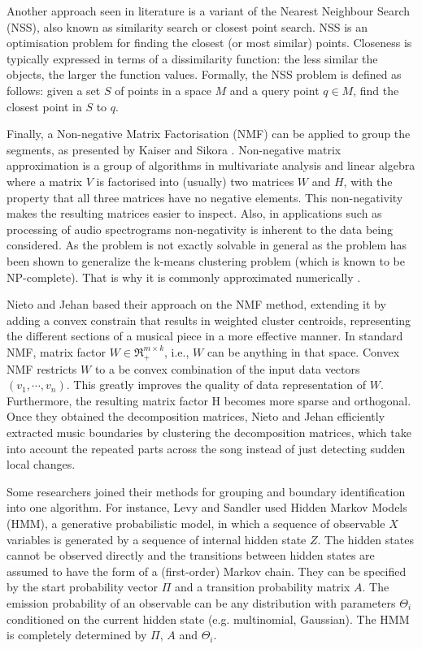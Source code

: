 Another approach seen in literature is a variant of the Nearest Neighbour Search (NSS), also known as similarity search or closest point search. NSS is an optimisation problem for finding the closest (or most similar) points. Closeness is typically expressed in terms of a dissimilarity function: the less similar the objects, the larger the function values. Formally, the NSS problem is defined as follows: given a set $S$ of points in a space $M$ and a query point $q \in M$, find the closest point in $S$ to $q$.

Finally, a Non-negative Matrix Factorisation (NMF) can be applied to group the segments, as presented by Kaiser and Sikora \cite{Sikora}. Non-negative matrix approximation is a group of algorithms in multivariate analysis and linear algebra where a matrix $V$ is factorised into (usually) two matrices $W$ and $H$, with the property that all three matrices have no negative elements. This non-negativity makes the resulting matrices easier to inspect. Also, in applications such as processing of audio spectrograms non-negativity is inherent to the data being considered. As the problem is not exactly solvable in general as the problem has been shown to generalize the k-means clustering problem (which is known to be NP-complete). That is why it is commonly approximated numerically \cite{NMFNP}.

Nieto and Jehan \cite{Nieto} based their approach on the NMF method, extending it by adding a convex constrain that results in weighted cluster centroids, representing the different sections of a musical piece in a more effective manner. 
In standard NMF, matrix factor $W \in \Re^{m \times k}_{+}$, i.e., $W$ can be anything in that space. Convex NMF restricts $W$ to a be convex combination of the input data vectors  $(v_1, \cdots, v_n)$. This greatly improves the quality of data representation of $W$. Furthermore, the resulting matrix factor H becomes more sparse and orthogonal. Once they obtained the decomposition matrices, Nieto and Jehan efficiently extracted music boundaries by clustering the decomposition matrices, which take into account the repeated parts across the song instead of just detecting sudden local changes.

Some researchers joined their methods for grouping and boundary identification into one algorithm. For instance, Levy and Sandler used Hidden Markov Models (HMM), a generative probabilistic model, in which a sequence of observable $X$ variables is generated by a sequence of internal hidden state $Z$. The hidden states cannot be observed directly and the transitions between hidden states are assumed to have the form of a (first-order) Markov chain. They can be specified by the start probability vector $\Pi$ and a transition probability matrix $A$. The emission probability of an observable can be any distribution with parameters $\Theta_{i}$ conditioned on the current hidden state (e.g. multinomial, Gaussian). The HMM is completely determined by $\Pi$, $A$ and $\Theta_{i}$.

